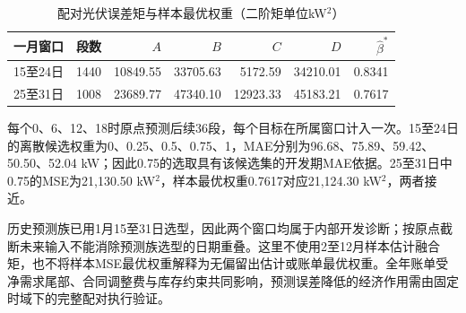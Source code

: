 \begin{table}[H]\centering\small\setlength{\tabcolsep}{3pt}
\caption{配对光伏误差矩与样本最优权重（二阶矩单位kW$^2$）}
\begin{tabular}{lrrrrrr}\toprule
一月窗口 & 段数 & $A$ & $B$ & $C$ & $D$ & $\widehat\beta^*$\\\midrule
15至24日 & 1440 & 10849.55 & 33705.63 & 5172.59 & 34210.01 & 0.8341 \\
25至31日 & 1008 & 23689.77 & 47340.10 & 12923.33 & 45183.21 & 0.7617 \\
\bottomrule\end{tabular}\end{table}
每个0、6、12、18时原点预测后续36段，每个目标在所属窗口计入一次。15至24日的离散候选权重为0、0.25、0.5、0.75、1，MAE分别为96.68、75.89、59.42、50.50、52.04 kW；因此0.75的选取具有该候选集的开发期MAE依据。25至31日中0.75的MSE为21,130.50 kW$^2$，样本最优权重0.7617对应21,124.30 kW$^2$，两者接近。

历史预测族已用1月15至31日选型，因此两个窗口均属于内部开发诊断；按原点截断未来输入不能消除预测族选型的日期重叠。这里不使用2至12月样本估计融合矩，也不将样本MSE最优权重解释为无偏留出估计或账单最优权重。全年账单受净需求尾部、合同调整费与库存约束共同影响，预测误差降低的经济作用需由固定时域下的完整配对执行验证。
